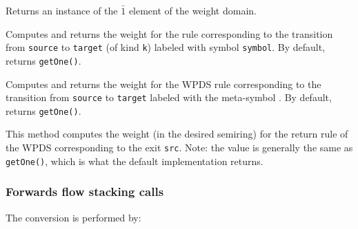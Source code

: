 \begin{functionlist} 
    \nopagebreak
    Returns an instance of the $\bar{1}$ element of the weight domain.

    \nopagebreak
    Computes and returns the weight for the rule corresponding to the
    transition from \texttt{source} to \texttt{target} (of
    kind \texttt{k})
    labeled with symbol \texttt{symbol}. By default, returns \texttt{getOne()}.

    Computes and returns the weight for the WPDS rule corresponding to the
    transition from \texttt{source} to \texttt{target} labeled with the
    meta-symbol \wild. By default, returns \texttt{getOne()}.

  This method computes the weight (in the desired semiring) for the return rule of
  the WPDS corresponding to the exit \texttt{src}.
  Note: the value is generally the same as \texttt{getOne()}, which is what the
  default implementation returns.

\end{functionlist}


\subsubsection{Forwards flow stacking calls}
\label{Se:wpds-forwards-flow-stacking-calls}

\noindent The conversion is performed by:



